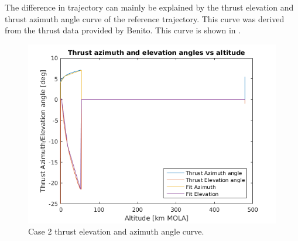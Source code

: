 The difference in trajectory can mainly be explained by the thrust elevation and thrust azimuth angle curve of the reference trajectory. This curve was derived from the thrust data provided by Benito. This curve is shown in . 

\begin{figure}[!ht]
\centering
\includegraphics[width=0.8 \textwidth]{figures/verification/case2/thrustAzimuthAndElevationDerivedFromCase2Version2.png}
\caption{Case 2 thrust elevation and azimuth angle curve.}
\label{fig:thrustAzimuthAndElevationDerivedFromCase2Version2}
\end{figure}


%
%


